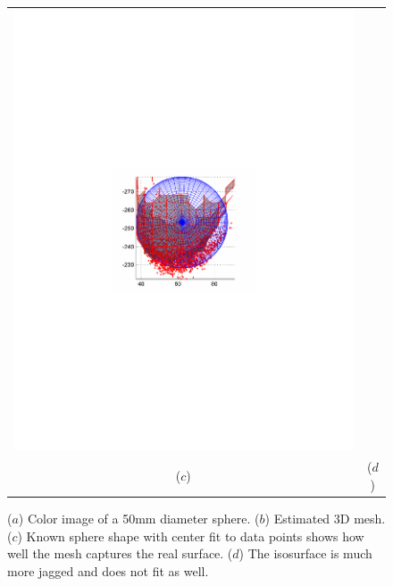 \begin{figure}
\begin{center}
\begin{tabular}{cc}
\includegraphics[trim=190 280 190 290,clip,width=0.48\linewidth]{Figures/sphere3DIsosurface} \\
($c$) & ($d$) \\
\end{tabular}
\end{center}
   \caption{($a$) Color image of a 50mm diameter sphere.  ($b$) Estimated $3$D mesh. ($c$) Known sphere shape with center fit to data points shows how well the mesh captures the real surface.  ($d$) The isosurface is much more jagged and does not fit as well.  }
\label{fig:sphere}
\end{figure}


